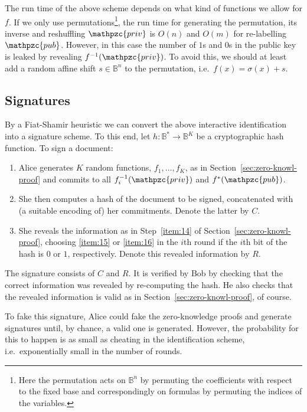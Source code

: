 \documentclass[final,journal,compsoc]{IEEEtran}
\newcommand{\priv}{\mathpzc{priv}}
\newcommand{\pub}{\mathpzc{pub}}
\begin{document}
The run time of the above scheme depends on what kind of functions we
allow for $f$. If we only use permutations\footnote{Here the
  permutation acts on $\mathbb B^n$ by permuting the coefficients with
  respect to the fixed base and correspondingly on formulas by
  permuting the indices of the variables.}, the run time for
generating the permutation, its inverse and reshuffling $\priv$ is
$O(n)$ and $O(m)$ for re-labelling $\pub$. However, in this case the
number of $1$s and $0$s in the public key is leaked by revealing
$f^{-1}(\priv)$. 
To avoid this, we should at least add a random affine shift
$s\in\mathbb B^n$ to the permutation, i.e.\ $f(x)=\sigma(x) + s$.





\subsection{Signatures\label{sec:signatures}}

By a Fiat-Shamir heuristic we can convert the above interactive
identification into a signature scheme. To this end, let $h: \mathbb
B^* \to \mathbb B^K$ be a cryptographic hash function. To sign a document:
\begin{enumerate}
\item Alice generates $K$ random functions, $f_1,\ldots,f_K$, as in
  Section~\ref{sec:zero-knowl-proof} and commits to all 
  $f_i^{-1}(\priv)$ and $f^*(\pub)$.
\item She then computes a hash of the document to be signed,
  concatenated with (a suitable encoding of) her commitments. Denote
  the latter by $C$.
\item She reveals the information as in Step~\ref{item:14} of
    Section~\ref{sec:zero-knowl-proof}, choosing \ref{item:15} or
      \ref{item:16} in the $i$th round if the $i$th bit of the hash is
      $0$ or $1$, respectively. Denote this
        revealed information by $R$.

\end{enumerate}
The signature consists of $C$ and $R$. It is verified by Bob by checking that the correct
information was revealed by re-computing the hash. He also checks that
the revealed information is valid as in
Section~\ref{sec:zero-knowl-proof}, of course.


To fake this signature, Alice could fake the zero-knowledge proofs and
generate signatures until, by chance, a valid one is
generated. However, the probability for this to happen is as small as
cheating in the identification scheme, i.e.\ exponentially small in
the number of rounds.
\end{document}
